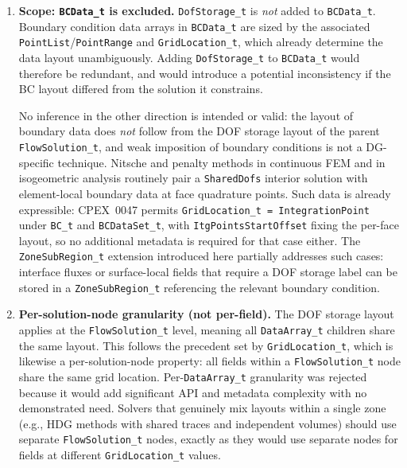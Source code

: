 \documentclass[11pt,letterpaper]{article}
\begin{document}
\begin{enumerate}[leftmargin=2em]

\item \label{dd:bcdata} \textbf{Scope: \texttt{BCData\_t} is excluded.}
  \texttt{DofStorage\_t} is \emph{not} added to
  \texttt{BCData\_t}.  Boundary condition data arrays in
  \texttt{BCData\_t} are sized by the associated
  \texttt{PointList}/\texttt{PointRange} and \texttt{GridLocation\_t},
  which already determine the data layout unambiguously.  Adding
  \texttt{DofStorage\_t} to \texttt{BCData\_t} would therefore be
  redundant, and would introduce a potential inconsistency if the BC
  layout differed from the solution it constrains.

  No inference in the other direction is intended or valid: the layout
  of boundary data does \emph{not} follow from the DOF storage layout of
  the parent \texttt{FlowSolution\_t}, and weak imposition of boundary
  conditions is not a DG-specific technique.  Nitsche and penalty
  methods in continuous FEM and in isogeometric analysis routinely pair
  a \texttt{SharedDofs} interior solution with element-local boundary data
  at face quadrature points.  Such data is already expressible:
  CPEX~0047 permits \texttt{GridLocation\_t = IntegrationPoint} under
  \texttt{BC\_t} and \texttt{BCDataSet\_t}, with
  \texttt{ItgPointsStartOffset} fixing the per-face layout, so no
  additional metadata is required for that case either.
  The \texttt{ZoneSubRegion\_t} extension introduced here
  partially addresses such cases: interface fluxes or
  surface-local fields that require a DOF storage label
  can be stored in a \texttt{ZoneSubRegion\_t} referencing the
  relevant boundary condition.

\item \textbf{Per-solution-node granularity (not per-field).}
  The DOF storage layout applies at the \texttt{FlowSolution\_t} level,
  meaning all \texttt{DataArray\_t} children share the same
  layout.  This follows the precedent set by
  \texttt{GridLocation\_t}, which is likewise a per-solution-node
  property: all fields within a \texttt{FlowSolution\_t} node share
  the same grid location.  Per-\texttt{DataArray\_t} granularity was
  rejected because it would add significant API and metadata
  complexity with no demonstrated need.  Solvers that genuinely mix
  layouts within a single zone (e.g., HDG methods with
  shared traces and independent volumes) should use separate
  \texttt{FlowSolution\_t} nodes, exactly as they would use separate
  nodes for fields at different \texttt{GridLocation\_t} values.


\end{enumerate}
\end{document}
